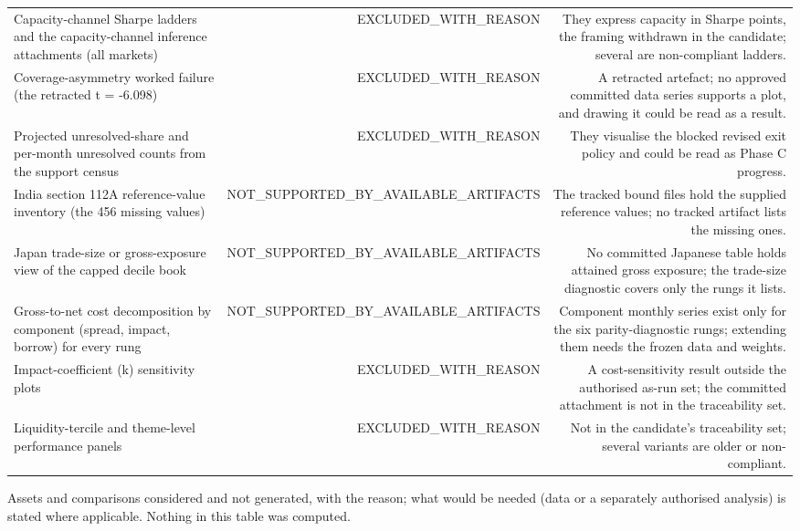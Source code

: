 \begin{table}[t]
\begin{tabular}{lrr}
Capacity-channel Sharpe ladders and the capacity-channel inference attachments (all markets) & EXCLUDED\_WITH\_REASON & They express capacity in Sharpe points, the framing withdrawn in the candidate; several are non-compliant ladders. \\
Coverage-asymmetry worked failure (the retracted t = -6.098) & EXCLUDED\_WITH\_REASON & A retracted artefact; no approved committed data series supports a plot, and drawing it could be read as a result. \\
Projected unresolved-share and per-month unresolved counts from the support census & EXCLUDED\_WITH\_REASON & They visualise the blocked revised exit policy and could be read as Phase C progress. \\
India section 112A reference-value inventory (the 456 missing values) & NOT\_SUPPORTED\_BY\_AVAILABLE\_ARTIFACTS & The tracked bound files hold the supplied reference values; no tracked artifact lists the missing ones. \\
Japan trade-size or gross-exposure view of the capped decile book & NOT\_SUPPORTED\_BY\_AVAILABLE\_ARTIFACTS & No committed Japanese table holds attained gross exposure; the trade-size diagnostic covers only the rungs it lists. \\
Gross-to-net cost decomposition by component (spread, impact, borrow) for every rung & NOT\_SUPPORTED\_BY\_AVAILABLE\_ARTIFACTS & Component monthly series exist only for the six parity-diagnostic rungs; extending them needs the frozen data and weights. \\
Impact-coefficient (k) sensitivity plots & EXCLUDED\_WITH\_REASON & A cost-sensitivity result outside the authorised as-run set; the committed attachment is not in the traceability set. \\
Liquidity-tercile and theme-level performance panels & EXCLUDED\_WITH\_REASON & Not in the candidate's traceability set; several variants are older or non-compliant. \\
\bottomrule
\end{tabular}
\par\vspace{2pt}
\parbox{\textwidth}{\footnotesize Assets and comparisons considered and not generated, with the reason; what would be needed (data or a separately authorised analysis) is stated where applicable. Nothing in this table was computed.}
\end{table}

